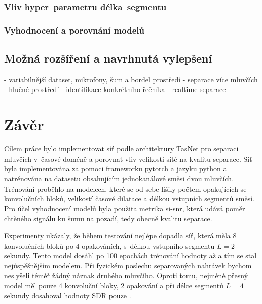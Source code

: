 \subsection{Vliv hyper--parametru délka--segmentu}

\subsection{Vyhodnocení a porovnání modelů}




\section{Možná rozšíření a navrhnutá vylepšení}
- variabilnější dataset, mikrofony, šum a bordel prostředí
- separace více mluvčích
- hlučné prostředí
- identifikace konkrétního řečníka
- realtime separace


\chapter{Závěr}
\label{zaver}

Cílem práce bylo implementovat síť podle architektury TasNet pro separaci mluvčích v~časové doméně a porovnat vliv velikosti sítě na kvalitu separace. Síť byla implementována za pomoci frameworku pytorch a jazyku python a natrénována na datasetu obsahujícím jednokanálové směsi dvou mluvčích. Trénování proběhlo na  modelech, které se od sebe lišily počtem opakujících se konvolučních bloků, velikostí časové dilatace a délkou vstupních segmentů směsí. Pro účel vyhodnocení modelů byla použita metrika si-snr, která udává poměr chtěného signálu ku šumu na pozadí, tedy obecně kvalitu separace. 

Experimenty ukázaly, že během testování nejlépe dopadla síť, která měla 8 konvolučních bloků po 4 opakováních, s~délkou vstupního segmentu $L=2$ sekundy. Tento model dosáhl po 100 epochách trénování hodnoty až  a tím se stal nejúspěšnějším modelem. Při fyzickém poslechu separovaných nahrávek bychom neslyšeli téměř žádný náznak druhého mluvčího. Oproti tomu, nejméně přesný model měl pouze 4 konvoluční bloky, 2 opakování a při délce segmentů $L=4$ sekundy dosahoval hodnoty SDR pouze .

